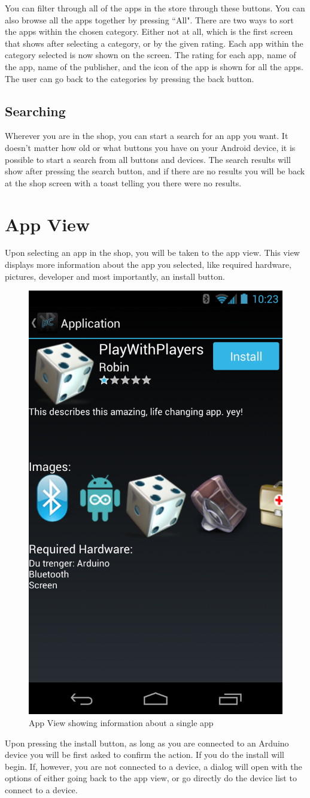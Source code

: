 		You can filter through all of the apps in the store through these buttons. You can also browse all the apps together by pressing ``All". There are two ways to sort the apps within the chosen category. Either not at all, which is the first screen that shows after selecting a category, or by the given rating. Each app within the category selected is now shown on the screen. The rating for each app, name of the app, name of the publisher, and the icon of the app is shown for all the apps. The user can go back to the categories by pressing the back button. \\

		\subsection{Searching}
			Wherever you are in the shop, you can start a search for an app you want. It doesn't matter how old or what buttons you have on your Android device, it is possible to start a search from all buttons and devices. The search results will show after pressing the search button, and if there are no results you will be back at the shop screen with a toast telling you there were no results.
\newpage
	\section{App View}
	Upon selecting an app in the shop, you will be taken to the app view. This view displays more information about the app you selected, like required hardware, pictures, developer and most importantly, an install button. 
	\newline
	\begin{figure}[H]
		\centering
		\includegraphics[width=0.5 \textwidth]{images/Screenshots/app_view.png}
		\caption{App View showing information about a single app}
	\end{figure}
	Upon pressing the install button, as long as you are connected to an Arduino device you will be first asked to confirm the action. If you do the install will begin. If, however, you are not connected to a device, a dialog will open with the options of either going back to the app view, or go directly do the device list to connect to a device.

